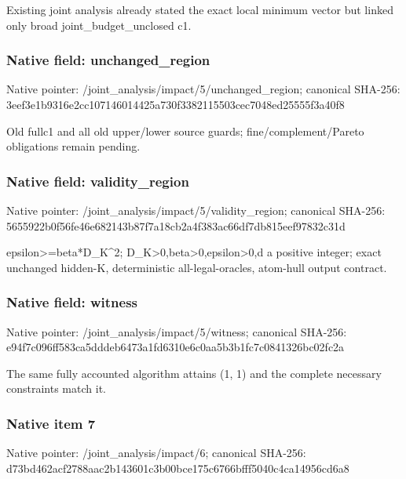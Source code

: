 \documentclass[10pt,a4paper]{article}
\begin{document}
\begingroup\raggedright\sloppy Existing joint analysis already stated the exact local minimum vector but linked only broad joint\_\allowbreak{}budget\_\allowbreak{}unclosed c1.\par\endgroup

\subsubsection{Native field: unchanged\_\allowbreak{}region}
Native pointer: /joint\_\allowbreak{}analysis/impact/5/unchanged\_\allowbreak{}region; canonical SHA-256: 3eef3e1b9316e2cc107146014425a730f3382115503cec7048ed25555f3a40f8

\begingroup\raggedright\sloppy Old fullc1 and all old upper/\allowbreak{}lower source guards;\allowbreak{} fine/\allowbreak{}complement/\allowbreak{}Pareto obligations remain pending.\par\endgroup

\subsubsection{Native field: validity\_\allowbreak{}region}
Native pointer: /joint\_\allowbreak{}analysis/impact/5/validity\_\allowbreak{}region; canonical SHA-256: 5655922b0f56fe46e682143b87f7a18cb2a4f383ac66df7db815eef97832c31d

\begingroup\raggedright\sloppy epsilon>=\allowbreak{}beta*D\_\allowbreak{}K\textasciicircum{}2;\allowbreak{} D\_\allowbreak{}K>0,\allowbreak{}beta>0,\allowbreak{}epsilon>0,\allowbreak{}d a positive integer;\allowbreak{} exact unchanged hidden-K,\allowbreak{} deterministic all-legal-oracles,\allowbreak{} atom-hull output contract.\par\endgroup

\subsubsection{Native field: witness}
Native pointer: /joint\_\allowbreak{}analysis/impact/5/witness; canonical SHA-256: e94f7c096ff583ca5dddeb6473a1fd6310e6c0aa5b3b1fc7c0841326bc02fc2a

\begingroup\raggedright\sloppy The same fully accounted algorithm attains (1,\allowbreak{} 1) and the complete necessary constraints match it.\par\endgroup

\subsubsection{Native item 7}
Native pointer: /joint\_\allowbreak{}analysis/impact/6; canonical SHA-256: d73bd462acf2788aac2b143601c3b00bce175c6766bfff5040c4ca14956cd6a8
\end{document}

